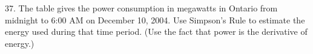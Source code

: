 \documentclass[preview]{standalone}
\begin{document}
\begin{center}
\large
37. The table gives the power consumption in megawatts in Ontario from midnight to 6:00 AM on December 10, 2004. Use Simpson's Rule to estimate the energy used during that time period. (Use the fact that power is the derivative of energy.)
\end{center}
\end{document}
